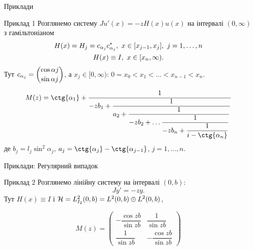 
\begin{frame}{Приклади}
	\begin{block}{Приклад 1}
		Розглянемо систему $Ju'(x)=-zH(x)u(x)$ на інтервалі $(0,\infty)$ з гамільтоніаном
		\begin{gather}\label{eq-4.31}
			H(x) = H_j = c_{\alpha_j}c^*_{\alpha_j}, \ x\in [x_{j-1},x_j], \ j=1,\ldots,n\\
			H(x) \equiv I, \ x\in[x_n,\infty). \notag
		\end{gather}
		Тут $c_{\alpha_j} = \dbinom{\cos{\alpha j}}{\sin{\alpha j}}$, а $x_j\in [0,\infty)$: $0=x_0<x_1<\ldots<x_{n-1}<x_n.$
	\end{block}
	\begin{equation}
		M(z) = \ctg{\alpha_1} + \dfrac{1}
									{-zb_1 + \dfrac{1}
												{a_2 + \dfrac{1}
															{-zb_2 + \ldots \dfrac{1}
																				{-zb_n + \dfrac{1}
																							{i-\ctg{\alpha_n}}}}}}
	\end{equation}
	де $b_j = l_j\sin^2{\alpha_j}$, $a_j = \ctg{\alpha_j} - \ctg{\alpha_{j-1}}$, $j=1,\ldots,n$.
\end{frame}

\begin{frame}{Приклади: Регулярний випадок}
	\begin{block}{Приклад 2}
		Розглянемо лінійну систему на інтервалі $(0,b)$:
		\begin{equation}\label{eq-4.25}
			Jy'=-zy.
		\end{equation}
		Тут $H(x)\equiv I$ і $\mathcal{H} = L^2_{I_2}(0,b) = L^2(0,b)\oplus L^2(0,b)$,
	\end{block}
	\begin{equation}\label{eq-4.27}
		M(z) = 
	  	\begin{pmatrix}
 	  		-\dfrac{\cos{zb}}{\sin{zb}} & \dfrac{1}{\sin{zb}}\\
	  		\dfrac{1}{\sin{zb}} & -\dfrac{\cos{zb}}{\sin{zb}}
	  	\end{pmatrix}
	\end{equation}
\end{frame}

